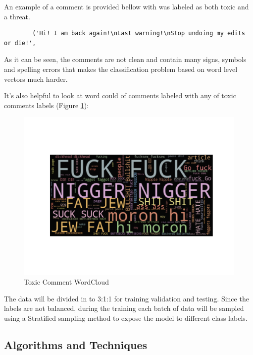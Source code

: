 \documentclass{article}
\begin{document}
    An example of a comment is provided bellow with was labeled as both toxic and a threat.

    \begin{verbatim}
        ('Hi! I am back again!\nLast warning!\nStop undoing my edits or die!',
    \end{verbatim}

    As it can be seen, the comments are not clean and contain many signs, symbols and spelling errors that makes the classification problem based on word level vectors much harder.

    It's also helpful to look at word could of comments labeled with any of toxic comments labels (Figure \ref{fig:wordcloud}):

    \begin{figure}[!h]
        \centering
        \includegraphics[scale=0.3]{figures/wordcloud.pdf}
        \caption{Toxic Comment WordCloud}
        \label{fig:wordcloud}
    \end{figure}


    The data will be divided in to 3:1:1 for training validation and testing. Since the labels are not balanced, during the training each batch of data will be sampled using a Stratified sampling method to expose the model to different class labels.

    \subsection{Algorithms and Techniques}
\end{document}

